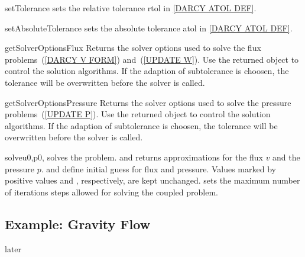 \begin{methoddesc}[DarcyFlow]{setTolerance}{}
sets the relative tolerance \mbox{rtol} in \ref{DARCY ATOL DEF}.
\end{methoddesc}

\begin{methoddesc}[DarcyFlow]{setAbsoluteTolerance}{}
sets the absolute tolerance \mbox{atol} in \ref{DARCY ATOL DEF}.
\end{methoddesc}

\begin{methoddesc}[DarcyFlow]{getSolverOptionsFlux}{}
Returns the solver options used to solve the flux problems~(\ref{DARCY V FORM}) and~(\ref{UPDATE W}). Use the returned \SolverOptions object to control the solution algorithms. If the adaption of subtolerance is choosen, the tolerance will 
be overwritten before the solver is called.
\end{methoddesc}

\begin{methoddesc}[DarcyFlow]{getSolverOptionsPressure}{}
Returns the solver options used to solve the pressure problems~(\ref{UPDATE P}). 
Use the returned \SolverOptions object to control the solution algorithms. If the adaption of subtolerance is choosen, the tolerance will 
be overwritten before the solver is called. 
\end{methoddesc}

\begin{methoddesc}[DarcyFlow]{solve}{u0,p0, }
solves the problem. and returns approximations for the flux $v$ and the pressure $p$. 
 and  define initial guess for flux and pressure. Values marked
by positive values  and , respectively, are kept unchanged.  sets the maximum number of iterations steps allowed for solving the coupled problem.
\end{methoddesc}


\subsection{Example: Gravity Flow}
later

%



